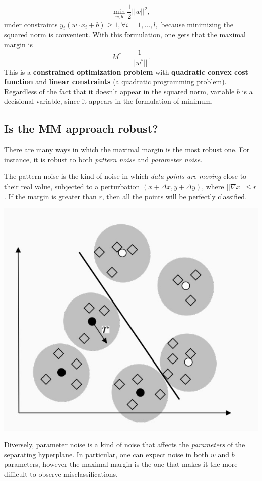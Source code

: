 \documentclass[10pt]{report}
\begin{document}
\[\min_{w, b} \frac 1 2 ||w||^2,\] under constraints \(y_i(w \cdot x_i + b) \geq 1, \forall i=1,\dots,l,\) because minimizing the squared norm is
convenient.
 With this formulation, one gets that the maximal margin is
\[M^ * = \frac{1}{||w^ * ||}.\] This is a \textbf{constrained optimization
problem} with \textbf{quadratic convex cost function} and \textbf{linear constraints}
(a quadratic programming problem). Regardless of the fact that it doesn't appear in the squared norm, variable \(b\) is a decisional variable, since it appears in the formulation of minimum.

\subsection{Is the MM approach robust?}
\label{is-the-mm-approach-robust}
There are many ways in which the maximal margin is the most robust one.
For instance, it is robust to both \emph{pattern noise} and \emph{parameter noise}.

The pattern noise is the kind of noise in which \emph{data points are moving} close to
their real value, subjected to a perturbation
\((x + \Delta x, y + \Delta y)\), where \(||\nabla x || \leq r\). If the
margin is greater than \(r\), then all the points will be perfectly
classified.

\begin{center}
\includegraphics[width=.9\linewidth]{./pics/svm/mm-pattern-noise.jpg}
\end{center}

Diversely, parameter noise is a kind of noise that affects the
\emph{parameters} of the separating hyperplane. In particular, one can expect
noise in both \(w\) and \(b\) parameters, however the maximal margin is
the one that makes it the more difficult to observe misclassifications.
\end{document}
